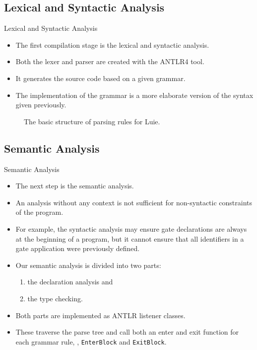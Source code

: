 \subsection{Lexical and Syntactic Analysis}
\begin{frame}{Lexical and Syntactic Analysis}
    \begin{itemize}
        \item The first compilation stage is the lexical and syntactic analysis.
        \item Both the lexer and parser are created with the ANTLR4 tool.
        \item It generates the source code based on a given grammar. 
        \item The implementation of the grammar is a more elaborate version of the syntax given previously.
    \end{itemize}
    \begin{figure}[h]
        \centering
        
        \caption{The basic structure of parsing rules for Luie.}
    \end{figure}
\end{frame}

\subsection{Semantic Analysis}
\begin{frame}{Semantic Analysis}
    \begin{itemize}
        \item The next step is the semantic analysis.
        \item An analysis without any context is not sufficient for non-syntactic constraints of the program.
        \item For example, the syntactic analysis may ensure gate declarations are always at the beginning of a program, but it cannot ensure that all identifiers in a gate application were previously defined.
        \item Our semantic analysis is divided into two parts:
        \begin{enumerate}
            \item the declaration analysis and
            \item the type checking.
        \end{enumerate}
        \item Both parts are implemented as ANTLR listener classes. 
        \item These traverse the parse tree and call both an enter and exit function for each grammar rule, \eg, \texttt{EnterBlock} and \texttt{ExitBlock}.
    \end{itemize}
\end{frame}

